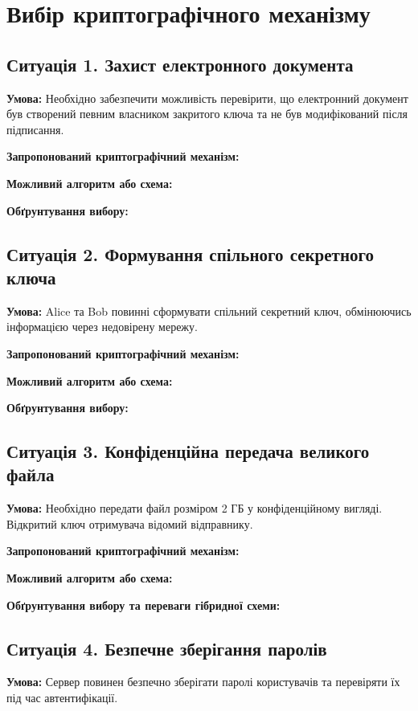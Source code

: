 \section{Вибір криптографічного механізму}

\subsection{Ситуація 1. Захист електронного документа}

\textbf{Умова:} Необхідно забезпечити можливість перевірити, що електронний документ був створений певним власником закритого ключа та не був модифікований після підписання.

\textbf{Запропонований криптографічний механізм:}

\textbf{Можливий алгоритм або схема:}

\textbf{Обґрунтування вибору:}

\subsection{Ситуація 2. Формування спільного секретного ключа}

\textbf{Умова:} Alice та Bob повинні сформувати спільний секретний ключ, обмінюючись інформацією через недовірену мережу.

\textbf{Запропонований криптографічний механізм:}

\textbf{Можливий алгоритм або схема:}

\textbf{Обґрунтування вибору:}

\subsection{Ситуація 3. Конфіденційна передача великого файла}

\textbf{Умова:} Необхідно передати файл розміром 2 ГБ у конфіденційному вигляді. Відкритий ключ отримувача відомий відправнику.

\textbf{Запропонований криптографічний механізм:}

\textbf{Можливий алгоритм або схема:}

\textbf{Обґрунтування вибору та переваги гібридної схеми:}

\subsection{Ситуація 4. Безпечне зберігання паролів}

\textbf{Умова:} Сервер повинен безпечно зберігати паролі користувачів та перевіряти їх під час автентифікації.

